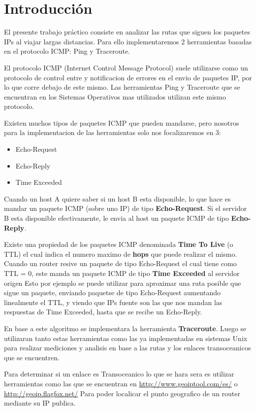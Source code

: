 \section{Introducci\'on}

El presente trabajo pr\'actico consiste en analizar las rutas que siguen los paquetes IPs al viajar largas distancias. Para ello implementaremos 2 herramientas basadas en el protocolo ICMP:
Ping y Traceroute.

El protocolo ICMP (Internet Control Message Protocol) suele utilizarse como un protocolo de control entre y notificacion de errores en el envio de paquetes IP, por lo que corre debajo de este mismo. Las herramientas Ping y Traceroute que se encuentran en los Sistemas Operativos mas utilizados utilizan este mismo protocolo.

Existen muchos tipos de paquetes ICMP que pueden mandarse, pero nosotros para la implementacion de las herramientas solo nos focalizaremos en 3:

\begin{itemize}
 \item Echo-Request
 \item Echo-Reply
 \item Time Exceeded
\end{itemize}

Cuando un host A quiere saber si un host B esta disponible, lo que hace es mandar un paquete ICMP (sobre uno IP) de tipo {\bf Echo-Request}. Si el servidor B esta disponible efectivamente, le envia al host un paquete ICMP de tipo {\bf Echo-Reply}.

Existe una propiedad de los paquetes ICMP denominada {\bf Time To Live} (o TTL) el cual indica el numero maximo de {\bf hops} que puede realizar el mismo. Cuando un router resive un paquete de tipo Echo-Request el cual tiene como TTL = 0, este manda un paquete ICMP de tipo {\bf Time Exceeded} al servidor origen Esto por ejemplo se puede utilizar para aproximar una ruta posible que sigue un paquete, enviando paquetse de tipo Echo-Request aumentando linealmente el TTL, y viendo que IPs fuente son las que nos mandan las respuestas de Time Exceeded, hasta que se recibe un Echo-Reply.

En base a este algoritmo se implementara la herramienta {\bf Traceroute}. Luego se utilizaran tanto estas herramientas como las ya implementadas en sistemas Unix para realizar mediciones y analisis en base a las rutas y los enlaces transoceanicos que se encuentren.

Para determinar si un enlace es Transoceanico lo que se hara sera es utilizar herramientas como las que se encuentran en \url{http://www.geoiptool.com/es/} o \url{http://geoip.flagfox.net/} Para poder localicar el punto geografico de un router mediante su IP publica.

